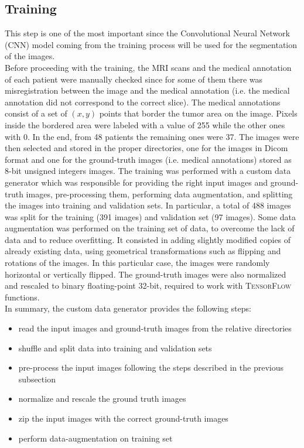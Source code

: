 \documentclass{standalone}
\begin{document}
\subsection{Training}

This step is one of the most important since the Convolutional Neural Network (CNN) model coming from the training process will be used for the segmentation of the images.\\
Before proceeding with the training, the MRI scans and the medical annotation of each patient were manually checked since for some of them there was misregistration between the image and the medical annotation (i.e. the medical annotation did not correspond to the correct slice).
The medical annotations consist of a set of $(x, y)$ points that border the tumor area on the image.
Pixels inside the bordered area were labeled with a value of 255 while the other ones with 0.
In the end, from 48 patients the remaining ones were 37.
The images were then selected and stored in the proper directories, one for the images in Dicom format and one for the ground-truth images (i.e. medical annotations) stored as 8-bit unsigned integers images.
The training was performed with a custom data generator which was responsible for providing the right input images and ground-truth images, pre-processing them, performing data augmentation, and splitting the images into training and validation sets. 
In particular, a total of 488 images was split for the training (391 images) and validation set (97 images).
Some data augmentation was performed on the training set of data, to overcome the lack of data and to reduce overfitting.
It consisted in adding slightly modified copies of already existing data, using geometrical transformations such as flipping and rotations of the images.
In this particular case, the images were randomly horizontal or vertically flipped.
The ground-truth images were also normalized and rescaled to binary floating-point 32-bit, required to work with \textsc{TensorFlow}\cite{Tensorflow} functions.
\\
In summary, the custom data generator provides the following steps: 
\begin{itemize}
    \item read the input images and ground-truth images from the relative directories
    \item shuffle and split data into training and validation sets
    \item pre-process the input images following the steps described in the previous subsection
    \item normalize and rescale the ground truth images
    \item zip the input images with the correct ground-truth images
    \item perform data-augmentation on training set
\end{itemize} 
\end{document}
